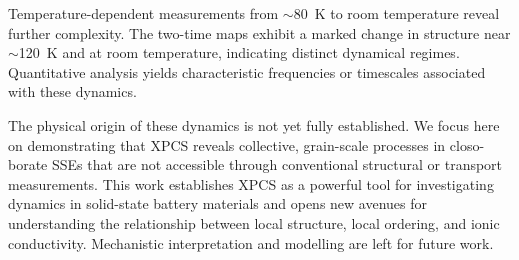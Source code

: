 Temperature-dependent measurements from $\sim$80~K to room temperature reveal further complexity. The two-time maps exhibit a marked change in structure near $\sim$120~K and at room temperature, indicating distinct dynamical regimes. Quantitative analysis yields characteristic frequencies or timescales associated with these dynamics.

The physical origin of these dynamics is not yet fully established. We focus here on demonstrating that XPCS reveals collective, grain-scale processes in closo-borate SSEs that are not accessible through conventional structural or transport measurements. This work establishes XPCS as a powerful tool for investigating dynamics in solid-state battery materials and opens new avenues for understanding the relationship between local structure, local ordering, and ionic conductivity. Mechanistic interpretation and modelling are left for future work.
